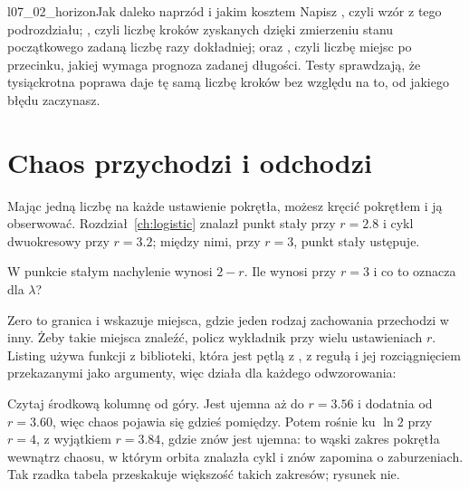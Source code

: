 \begin{lab}{l07_02_horizon}{Jak daleko naprzód i jakim kosztem}
Napisz , czyli wzór z tego podrozdziału; ,
czyli liczbę kroków zyskanych dzięki zmierzeniu stanu początkowego zadaną
liczbę razy dokładniej; oraz , czyli liczbę miejsc po
przecinku, jakiej wymaga prognoza zadanej długości. Testy sprawdzają, że
tysiąckrotna poprawa daje tę samą liczbę kroków bez względu na to, od jakiego
błędu zaczynasz.
\end{lab}

\section{Chaos przychodzi i odchodzi}
\label{sec:ch07-sweep}

\noindent
Mając jedną liczbę na każde ustawienie pokrętła, możesz kręcić pokrętłem i
ją obserwować. Rozdział~\ref{ch:logistic} znalazł punkt stały przy
$r = \num{2.8}$ i cykl dwuokresowy przy $r = \num{3.2}$; między nimi, przy
$r = 3$, punkt stały ustępuje.

\begin{think}
W punkcie stałym nachylenie wynosi $2 - r$. Ile wynosi przy $r = 3$ i co to
oznacza dla $\lambda$?
\end{think}
Zero to granica i wskazuje miejsca, gdzie jeden rodzaj zachowania przechodzi
w inny. Żeby takie miejsca znaleźć, policz wykładnik przy wielu ustawieniach
$r$. Listing używa funkcji  z biblioteki, która jest pętlą z
, z regułą i jej rozciągnięciem przekazanymi jako argumenty,
więc działa dla każdego odwzorowania:



\noindent
Czytaj środkową kolumnę od góry. Jest ujemna aż do $r = \num{3.56}$ i
dodatnia od $r = \num{3.60}$, więc chaos pojawia się gdzieś pomiędzy. Potem
rośnie ku $\ln 2$ przy $r = 4$, z wyjątkiem $r = \num{3.84}$, gdzie znów jest
ujemna: to wąski zakres pokrętła wewnątrz chaosu, w którym orbita znalazła
cykl i znów zapomina o zaburzeniach. Tak rzadka tabela przeskakuje większość
takich zakresów; rysunek nie.

